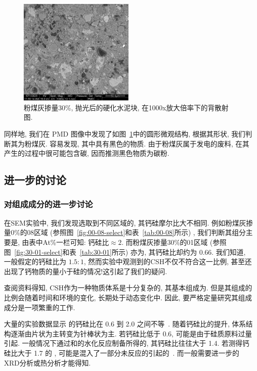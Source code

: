 \begin{figure}[!t]
  \centering
  \includegraphics[width = 0.5\textwidth]{assets/30-polished-01000x-PMD.png}
  \caption{粉煤灰掺量30\%, 抛光后的硬化水泥块, 在1000x放大倍率下的背散射图. }
  \label{fig:BSE-FA}
\end{figure}

同样地, 我们在 PMD 图像中发现了如图~\ref{fig:BSE-FA}中的圆形微观结构, 根据其形状, 我们判断其为粉煤灰. 容易发现, 其中具有黑色的物质. 由于粉煤灰属于发电的废料, 在其产生的过程中很可能包含碳, 因而推测黑色物质为碳粉.

\subsection{进一步的讨论}

\subsubsection{对组成成分的进一步讨论}

在SEM实验中, 我们发现选取到不同区域的, 其钙硅摩尔比大不相同. 例如粉煤灰掺量0\%的08区域 (参照图~\ref{fig:00-08-select}和表~\ref{tab:00-08}所示) , 我们判断其组分主要是, 由表中At\%一栏可知: $\text{钙硅比}\approx 2$. 而粉煤灰掺量30\%的01区域 (参照图~\ref{fig:30-01-select}和表~\ref{tab:30-01}所示) 亦为, 其钙硅比却约为 \num{0.66}. 我们知道, 一般假定的钙硅比为 $1.5:1$, 然而实验中观测到的CSH不仅不符合这一比例, 甚至还出现了钙物质的量小于硅的情况!这引起了我们的疑问.

查阅资料得知, CSH作为一种物质体系是十分复杂的, 其基本组成为. 但是其组成的比例会随着时间和环境的变化, 长期处于动态变化中. 因此, 要严格定量研究其组成成分是一项繁重的工作.

大量的实验数据显示  的钙硅比在 \num{0.6} 到 \num{2.0} 之间不等~\cite{lv_concrete}. 随着钙硅比的提升, 体系结构逐渐由片状为主转变为针棒状为主. 若钙硅比低于 \num{0.6}, 可能是由于硅质原料过量引起. 一般情况下通过和的水化反应制备所得的, 其钙硅比往往大于 \num{1.4}. 若测得钙硅比大于 \num{1.7} 的 , 可能是混入了一部分未反应的引起的~\cite{zhao_hydrated}. 而一般需要进一步的XRD分析或热分析才能得知.

